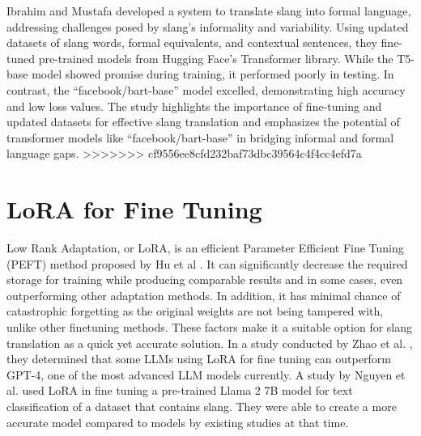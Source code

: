 Ibrahim and Mustafa \cite{Abdulstar_Ibrahim_Shareef_Mustafa_2023}  developed a system to translate slang into formal language, addressing challenges posed by slang's informality and variability. Using updated datasets of slang words, formal equivalents, and contextual sentences, they fine-tuned pre-trained models from Hugging Face's Transformer library. While the T5-base model showed promise during training, it performed poorly in testing. In contrast, the “facebook/bart-base” model excelled, demonstrating high accuracy and low loss values. The study highlights the importance of fine-tuning and updated datasets for effective slang translation and emphasizes the potential of transformer models like “facebook/bart-base” in bridging informal and formal language gaps. 
>>>>>>> cf9556ee8cfd232baf73dbc39564c4f4cc4efd7a

\section{LoRA for Fine Tuning}
Low Rank Adaptation, or LoRA, is an efficient Parameter Efficient Fine Tuning (PEFT) method proposed by Hu et al \cite{hu2021loralowrankadaptationlarge}.
It can significantly decrease the required storage for training while producing comparable results and in some cases, even outperforming other adaptation methods.
In addition, it has minimal chance of catastrophic forgetting as the original weights are not being tampered with, unlike other finetuning methods.
These factors make it a suitable option for slang translation as a quick yet accurate solution.
In a study conducted by Zhao et al. \cite{zhao2024loraland310finetuned}, they determined that some LLMs using LoRA for fine tuning can outperform GPT-4, one of the most advanced LLM models currently.
A study by Nguyen et al. \cite{nguyen2023finetuningllama2large} used LoRA in fine tuning a pre-trained Llama 2 7B model for text classification of a dataset that contains slang.
They were able to create a more accurate model compared to models by existing studies at that time. 

